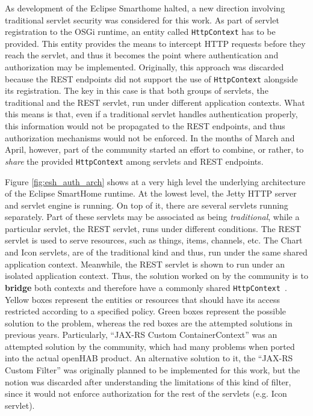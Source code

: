 \documentclass[12pt]{article}
\begin{document}
As development of the Eclipse Smarthome halted, a new direction involving traditional servlet security was considered for this work. As part of servlet registration to the OSGi runtime, an entity called \texttt{HttpContext} has to be provided. This entity provides the means to intercept HTTP requests before they reach the servlet, and thus it becomes the point where authentication and authorization may be implemented. Originally, this approach was discarded because the REST endpoints did not support the use of \texttt{HttpContext} alongside its registration. The key in this case is that both groups of servlets, the traditional and the REST servlet, run under different application contexts. What this means is that, even if a traditional servlet handles authentication properly, this information would not be propagated to the REST endpoints, and thus authorization mechanisms would not be enforced. In the months of March and April, however, part of the community started an effort to combine, or rather, to \emph{share} the provided \texttt{HttpContext} among servlets and REST endpoints.

Figure \ref{fig:esh_auth_arch} shows at a very high level the underlying architecture of the Eclipse SmartHome runtime. At the lowest level, the Jetty HTTP server and servlet engine is running. On top of it, there are several servlets running separately. Part of these servlets may be associated as being \emph{traditional}, while a particular servlet, the REST servlet, runs under different conditions. The REST servlet is used to serve resources, such as things, items, channels, etc. The Chart and Icon servlets, are of the traditional kind and thus, run under the same shared application context. Meanwhile, the REST servlet is shown to run under an isolated application context. Thus, the solution worked on by the community is to \textbf{bridge} both contexts and therefore have a commonly shared \texttt{HttpContext}~\cite{esh_03}. Yellow boxes represent the entities or resources that should have its access restricted according to a specified policy. Green boxes represent the possible solution to the problem, whereas the red boxes are the attempted solutions in previous years. Particularly, ``JAX-RS Custom ContainerContext'' was an attempted solution by the community, which had many problems when ported into the actual openHAB product. An alternative solution to it, the ``JAX-RS Custom Filter'' was originally planned to be implemented for this work, but the notion was discarded after understanding the limitations of this kind of filter, since it would not enforce authorization for the rest of the servlets (e.g. Icon servlet). 
\end{document}
